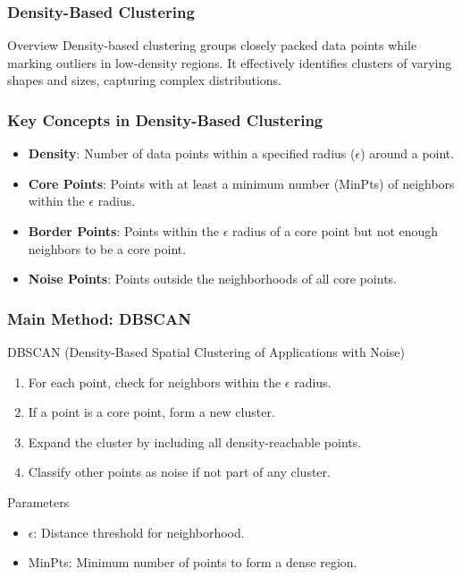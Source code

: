 \documentclass{beamer}
\begin{document}
\begin{frame}
    \frametitle{Density-Based Clustering}
    \begin{block}{Overview}
        Density-based clustering groups closely packed data points while marking outliers in low-density regions. It effectively identifies clusters of varying shapes and sizes, capturing complex distributions.
    \end{block}
\end{frame}

\begin{frame}
    \frametitle{Key Concepts in Density-Based Clustering}
    \begin{itemize}
        \item \textbf{Density}: Number of data points within a specified radius ($\epsilon$) around a point.
        \item \textbf{Core Points}: Points with at least a minimum number (MinPts) of neighbors within the $\epsilon$ radius.
        \item \textbf{Border Points}: Points within the $\epsilon$ radius of a core point but not enough neighbors to be a core point.
        \item \textbf{Noise Points}: Points outside the neighborhoods of all core points.
    \end{itemize}
\end{frame}

\begin{frame}
    \frametitle{Main Method: DBSCAN}
    \begin{block}{DBSCAN (Density-Based Spatial Clustering of Applications with Noise)}
        \begin{enumerate}
            \item For each point, check for neighbors within the $\epsilon$ radius.
            \item If a point is a core point, form a new cluster.
            \item Expand the cluster by including all density-reachable points.
            \item Classify other points as noise if not part of any cluster.
        \end{enumerate}
    \end{block}
    \begin{block}{Parameters}
        \begin{itemize}
            \item $\epsilon$: Distance threshold for neighborhood.
            \item MinPts: Minimum number of points to form a dense region.
        \end{itemize}
    \end{block}
\end{frame}
\end{document}
